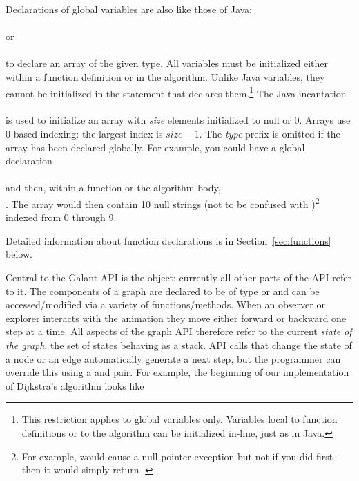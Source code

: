 Declarations of global variables are also like those of Java:\\
\hspace*{1em}\\
or\\
\hspace*{1em}\\
to declare an array of the given type.
All variables must be initialized either within a function definition or
in the algorithm.
Unlike Java variables, they cannot be initialized in the statement that
declares them.\footnote{This restriction applies to global variables
  only. Variables local to function definitions or to the algorithm can be
  initialized in-line, just as in Java.
}
The Java incantation\\
\hspace*{1em}\\
is used to initialize an array with \emph{size} elements initialized to \textsf{null}
or 0. Arrays use 0-based indexing: the largest index is $\mathit{size} -
1$. The \emph{type} prefix is omitted if the array has been declared
globally.
For example, you could have a global declaration\\
\hspace*{1em}\\
and then, within a function or the algorithm body,\\
\hspace*{1em}.
The array  would then contain 10 null strings (not to be confused
with )\footnote{
  For example,  would cause a null pointer
  exception but not if you did  first -- then it would
  simply return .
}
indexed from 0 through 9.

Detailed
information about function declarations is in Section~\ref{sec:functions}
below.

Central to the Galant API is the  object: currently all other
parts of the API refer to it.
The components of a graph are declared to be of type  or
 and can be accessed/modified via a variety of
functions/methods.
When an observer or explorer interacts with the animation they move either
forward or backward one step at a time.
All aspects of the graph API therefore refer to the current \emph{state of
  the graph}, the set of states behaving as a stack.
API calls that change the state of a node or an edge automatically
generate a next step,
but the programmer can override this using a  and
 pair. For example, the beginning of our implementation of
Dijkstra's algorithm looks like


